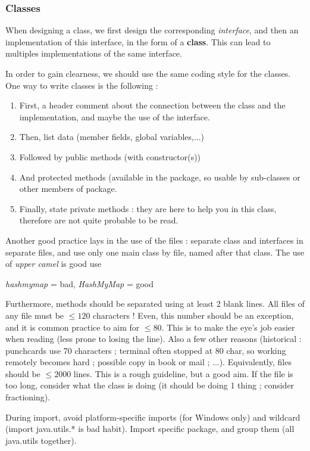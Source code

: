 \documentclass[12pt,a4paper]{article}
\begin{document}
\subsubsection{Classes}
When designing a class, we first design the corresponding \textit{interface}, and then an implementation of this interface, in the form of a \textbf{class}. This can lead to multiples implementations of the same interface.

In order to gain clearness, we should use the same coding style for the classes. One way to write classes is the following : 
\begin{enumerate}
    \item First, a header comment about the connection between the class and the implementation, and maybe the use of the interface.
    \item Then, list data (member fields, global variables,...)
    \item Followed by public methods (with constructor(s))
    \item And protected methods (available in the package, so usable by sub-classes or other members of package.
    \item Finally, state private methods : they are here to help you in this class, therefore are not quite probable to be read.
\end{enumerate}
Another good practice lays in the use of the files : separate class and interfaces in separate files, and use only one main class by file, named after that class. The use of \textit{upper camel} is good use
\begin{example}
    \textit{hashmymap} = bad, \textit{HashMyMap} = good
\end{example}
Furthermore, methods should be separated using at least 2 blank lines. All files of any file must be $\leq 120$ characters ! Even, this number should be an exception, and it is common practice to aim for $\leq 80$. This is to make the eye's job easier when reading (less prone to losing the line). Also a few other reasons (historical : punchcards use 70 characters ; terminal often stopped at 80 char, so working remotely becomes hard ;  possible copy in book or mail ; ...). Equivalently, files should be $\leq 2000$ lines. This is a rough guideline, but a good aim. If the file is too long, consider what the class is doing (it should be doing 1 thing ; consider fractioning).

During import, avoid platform-specific imports (for Windows only) and wildcard (import java.utils.* is bad habit). Import specific package, and group them (all java.utils together). 
\end{document}
